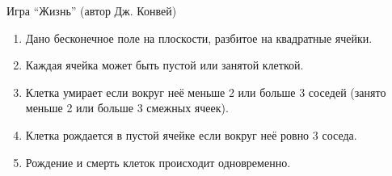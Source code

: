 \documentclass[12pt, compress]{beamer}
\begin{document}
 


\begin{frame}[fragile]{Игра ``Жизнь'' (автор Дж. Конвей)}  
  \begin{enumerate}
   \item Дано бесконечное поле на плоскости, разбитое на квадратные ячейки.
   \item Каждая ячейка может быть пустой или занятой клеткой.
   \item Клетка умирает если вокруг неё меньше 2 или больше 3 соседей (занято меньше 2 или больше 3 смежных ячеек).
   \item Клетка рождается в пустой ячейке если вокруг неё ровно 3 соседа.
   \item Рождение и смерть клеток происходит одновременно.
  \end{enumerate}  
\end{frame}
\end{document}

